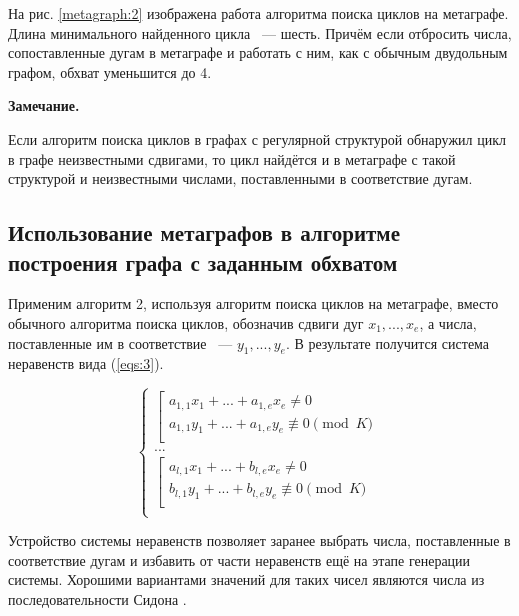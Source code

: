 \documentclass[14pt]{mmcs-article}
\begin{document}
\newpage

На рис. \ref{metagraph:2} изображена работа алгоритма поиска циклов на метаграфе. Длина минимального найденного цикла ~--- шесть. Причём если отбросить числа, сопоставленные дугам в метаграфе и работать с ним, как с обычным двудольным графом, обхват уменьшится до 4.

\textbf{Замечание.}

Если алгоритм поиска циклов в графах с регулярной структурой обнаружил цикл в графе неизвестными сдвигами, то цикл найдётся и в метаграфе с такой структурой и неизвестными числами, поставленными в соответствие дугам.

\subsection{Использование метаграфов в алгоритме\\ построения графа с заданным обхватом}

Применим алгоритм 2, используя алгоритм поиска циклов на метаграфе, вместо обычного алгоритма поиска циклов, обозначив сдвиги дуг $x_1, ..., x_e$, а числа, поставленные им в соответствие ~--- $y_1, ..., y_e$. В результате получится система неравенств вида (\ref{eqs:3}).

\begin{equation}
  \left\{
    \begin{array}{ll}
        \left[  
          \begin{array}{ll}
              a_{1,1} x_1 + ... + a_{1,e} x_e \neq 0 \\
              a_{1,1} y_1 + ... + a_{1,e} y_e \not\equiv 0 \pmod K \\
          \end{array}
        \right.\\
        ...\\
        \left[  
          \begin{array}{ll}
              a_{l,1} x_1 + ... + b_{l,e} x_e \neq 0 \\
              b_{l,1} y_1 + ... + b_{l,e} y_e \not\equiv 0 \pmod K \\
          \end{array}
        \right.\\
    \end{array}
  \right.
  \label{eqs:3}
\end{equation}

Устройство системы неравенств позволяет заранее выбрать числа, поставленные в соответствие дугам и избавить от части неравенств ещё на этапе генерации системы. Хорошими вариантами значений для таких чисел являются числа из последовательности Сидона \cite{sidon}.
\end{document}
